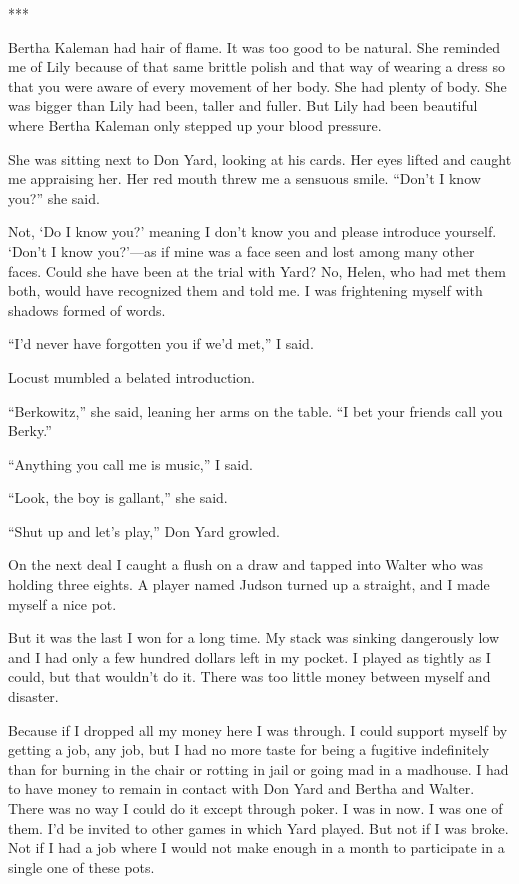 {***

Bertha Kaleman had hair of flame. It was too good to be natural. She reminded me of Lily because of that same brittle polish and that way of wearing a dress so that you were aware of every movement of her body. She had plenty of body. She was bigger than Lily had been, taller and fuller. But Lily had been beautiful where Bertha Kaleman only stepped up your blood pressure.

She was sitting next to Don Yard, looking at his cards. Her eyes lifted and caught me appraising her. Her red mouth threw me a sensuous smile. “Don’t I know you?” she said.

Not, ‘Do I know you?’ meaning I don’t know you and please introduce yourself. ‘Don’t I know you?’—as if mine was a face seen and lost among many other faces. Could she have been at the trial with Yard? No, Helen, who had met them both, would have recognized them and told me. I was frightening myself with shadows formed of words.

“I’d never have forgotten you if we’d met,” I said.

Locust mumbled a belated introduction.

“Berkowitz,” she said, leaning her arms on the table. “I bet your friends call you Berky.”

“Anything you call me is music,” I said.

“Look, the boy is gallant,” she said.

“Shut up and let’s play,” Don Yard growled.

On the next deal I caught a flush on a draw and tapped into Walter who was holding three eights. A player named Judson turned up a straight, and I made myself a nice pot.

But it was the last I won for a long time. My stack was sinking dangerously low and I had only a few hundred dollars left in my pocket. I played as tightly as I could, but that wouldn’t do it. There was too little money between myself and disaster.

Because if I dropped all my money here I was through. I could support myself by getting a job, any job, but I had no more taste for being a fugitive indefinitely than for burning in the chair or rotting in jail or going mad in a madhouse. I had to have money to remain in contact with Don Yard and Bertha and Walter. There was no way I could do it except through poker. I was in now. I was one of them. I’d be invited to other games in which Yard played. But not if I was broke. Not if I had a job where I would not make enough in a month to participate in a single one of these pots.

}
